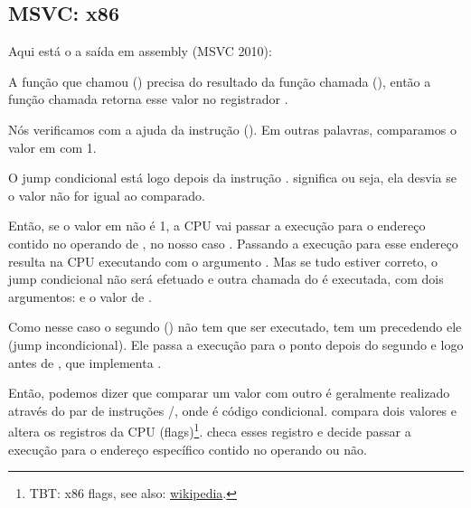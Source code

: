 \subsection{MSVC: x86}

Aqui está o a saída em assembly (MSVC 2010):



A função que chamou (\main) precisa do resultado da função chamada (\scanf),
então a função chamada retorna esse valor no registrador \EAX.

Nós verificamos com a ajuda da instrução  (). Em outras palavras, comparamos o valor em \EAX com 1.

O jump condicional \JNE está logo depois da instrução \CMP. \JNE significa  ou seja, ela desvia se o valor não for igual ao comparado.

Então, se o valor em \EAX não é 1, a \ac{CPU} vai passar a execução para o endereço contido no operando de \JNE, no nosso caso .
Passando a execução para esse endereço resulta na \ac{CPU} executando \printf com o argumento .
Mas se tudo estiver correto, o jump condicional não será efetuado e outra chamada do \printf é executada, com dois argumentos:  e o valor de .

Como nesse caso o segundo \printf() não tem que ser executado, tem um \JMP precedendo ele (jump incondicional).
Ele passa a execução para o ponto depois do segundo \printf e logo antes de , que implementa .

Então, podemos dizer que comparar um valor com outro é geralmente realizado através do par de instruções \CMP/\Jcc, onde  é código condicional.
\CMP compara dois valores e altera os registros da \ac{CPU} (flags)\footnote{\ac{TBT}: x86 flags, see also: \href{http://go.yurichev.com/17120}{wikipedia}.}.
\Jcc checa esses registro e decide passar a execução para o endereço específico contido no operando ou não.

